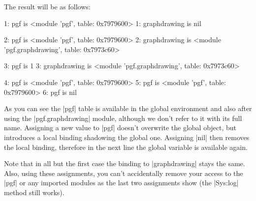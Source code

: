\begin{codeexample}
  

  \usetikzlibrary{graphdrawing}

\end{codeexample}

The result will be as follows:

\begin{codeexample}
1: pgf is <module 'pgf', table: 0x7979600>
1: graphdrawing is nil

2: pgf is <module 'pgf', table: 0x7979600>
2: graphdrawing is <module 'pgf.graphdrawing', table: 0x7973c60>

3: pgf is 1
3: graphdrawing is <module 'pgf.graphdrawing', table: 0x7973c60>

4: pgf is <module 'pgf', table: 0x7979600>
5: pgf is <module 'pgf', table: 0x7979600>
6: pgf is nil
\end{codeexample}

As you can see the |pgf| table is available in the global environment
and also after using the |pgf.graphdrawing| module, although we don't
refer to it with its full name.  Assigning a new value to |pgf|
doesn't overwrite the global object, but introduces a local binding
shadowing the global one. Assigning |nil| then removes the local
binding, therefore in the next line the global variable is available
again.

Note that in all but the first case the binding to |graphdrawing|
stays the same.  Also, using these assignments, you can't accidentally
remove your access to the |pgf| or any imported modules as the last
two assignments show (the |Sys:log| method still works).


